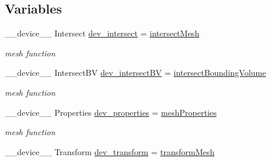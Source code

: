 \subsection*{Variables}
\begin{DoxyCompactItemize}
\item 
\+\_\+\+\_\+device\+\_\+\+\_\+ Intersect \hyperlink{group__device__pointers_ga00654ffb007d4b5c95c00b429dc26ae9}{dev\+\_\+intersect} = \hyperlink{group__intersection__test__prperties_gac9af7cfe676f4df793dea5bc53171161}{intersect\+Mesh}\hypertarget{group__device__pointers_ga00654ffb007d4b5c95c00b429dc26ae9}{}\label{group__device__pointers_ga00654ffb007d4b5c95c00b429dc26ae9}

\begin{DoxyCompactList}\small\item\em mesh function \end{DoxyCompactList}\item 
\+\_\+\+\_\+device\+\_\+\+\_\+ Intersect\+BV \hyperlink{group__device__pointers_gaeee39cf2f67c91f2a6c312651283dc94}{dev\+\_\+intersect\+BV} = \hyperlink{group__intersection__test__prperties_gaf6bbee9e8a6ee564017fa94cd9e6ec63}{intersect\+Bounding\+Volume}\hypertarget{group__device__pointers_gaeee39cf2f67c91f2a6c312651283dc94}{}\label{group__device__pointers_gaeee39cf2f67c91f2a6c312651283dc94}

\begin{DoxyCompactList}\small\item\em mesh function \end{DoxyCompactList}\item 
\+\_\+\+\_\+device\+\_\+\+\_\+ Properties \hyperlink{group__device__pointers_gac0d627981d2453b8f45dc3cca7a69a28}{dev\+\_\+properties} = \hyperlink{group__intersection__test__prperties_gaa26e85d7aac46c25d6a1b975423f968d}{mesh\+Properties}\hypertarget{group__device__pointers_gac0d627981d2453b8f45dc3cca7a69a28}{}\label{group__device__pointers_gac0d627981d2453b8f45dc3cca7a69a28}

\begin{DoxyCompactList}\small\item\em mesh function \end{DoxyCompactList}\item 
\+\_\+\+\_\+device\+\_\+\+\_\+ Transform \hyperlink{group__device__pointers_gac3760d5ca4da6826e005200738140558}{dev\+\_\+transform} = \hyperlink{group__intersection__test__prperties_ga4b2a399a49c34312c8369f54b79230af}{transform\+Mesh}\hypertarget{group__device__pointers_gac3760d5ca4da6826e005200738140558}{}\label{group__device__pointers_gac3760d5ca4da6826e005200738140558}


\end{DoxyCompactItemize}
